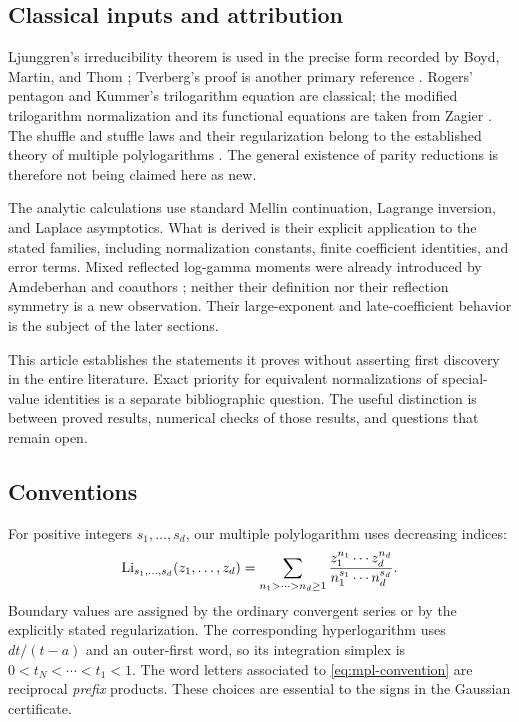\subsection{Classical inputs and attribution}

Ljunggren's irreducibility theorem is used in the precise form recorded
by Boyd, Martin, and Thom \cite[Lemma 4.1]{BoydMartinThom2015}; Tverberg's
proof is another primary reference \cite{Tverberg1960}. Rogers' pentagon
and Kummer's trilogarithm equation are classical; the modified
trilogarithm normalization and its functional equations are taken from
Zagier \cite{ZagierPolylogs1991}. The shuffle and stuffle laws and their
regularization belong to the established theory of multiple
polylogarithms \cite{jqzhao2010,PanzerParity}. The general existence
of parity reductions is therefore not being claimed here as new.

The analytic calculations use standard Mellin continuation, Lagrange
inversion, and Laplace asymptotics. What is derived is their explicit
application to the stated families, including normalization constants,
finite coefficient identities, and error terms. Mixed reflected
log-gamma moments were already introduced by Amdeberhan and coauthors
\cite{ACEMKM}; neither their definition nor their reflection symmetry
is a new observation. Their large-exponent and late-coefficient
behavior is the subject of the later sections.

This article establishes the statements it proves without asserting
first discovery in the entire literature. Exact priority for equivalent
normalizations of special-value identities is a separate bibliographic
question. The useful distinction is between proved results, numerical
checks of those results, and questions that remain open.

\subsection{Conventions}

For positive integers $s_1,\ldots,s_d$, our multiple polylogarithm uses
decreasing indices:
\begin{equation}\label{eq:mpl-convention}
 \operatorname{Li}_{s_1,\ldots,s_d}(z_1,\ldots,z_d)
 =\sum_{n_1>\cdots>n_d\geq1}
 \frac{z_1^{n_1}\cdots z_d^{n_d}}
 {n_1^{s_1}\cdots n_d^{s_d}}.
\end{equation}
Boundary values are assigned by the ordinary convergent series or by
the explicitly stated regularization. The corresponding hyperlogarithm
uses $dt/(t-a)$ and an outer-first word, so its integration simplex is
$0<t_N<\cdots<t_1<1$. The word letters associated to
\eqref{eq:mpl-convention} are reciprocal \emph{prefix} products.
These choices are essential to the signs in the Gaussian certificate.

